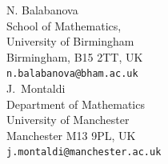 \documentclass[11pt,twoside]{article}
\theoremstyle{definition}
\numberwithin{equation}{section}
\begin{document}
\setlength{\parindent}{0pt}
\small
\hrulefill

\bigskip 

{N. Balabanova} \\
School of Mathematics, \\
University of Birmingham\\ Birmingham, B15 2TT, UK\\
\texttt{n.balabanova@bham.ac.uk}\\

{J.~Montaldi}\\
Department of Mathematics\\
University of Manchester\\
Manchester M13 9PL, UK\\
\texttt{j.montaldi@manchester.ac.uk}
\end{document}
